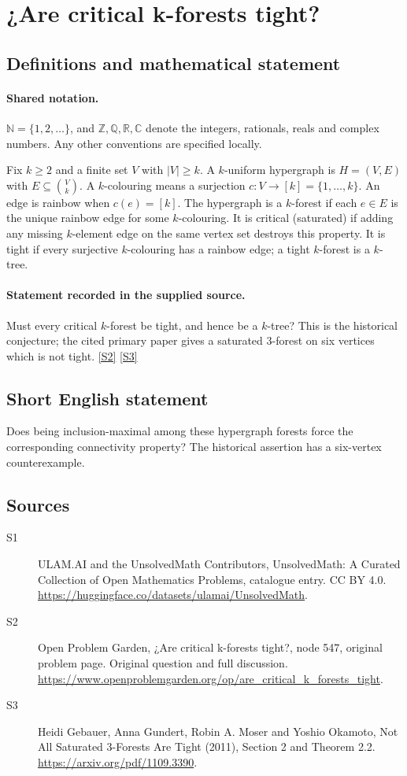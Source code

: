 \documentclass[11pt]{article}
\newcommand{\sref}[2]{\hyperlink{source:#1:#2}{[S#2]}}
\begin{document}
\section{¿Are critical k-forests tight?}\label{statement}

\subsection{Definitions and mathematical statement}

\paragraph{Shared notation.}$\mathbb N=\{1,2,\ldots\}$, and $\mathbb Z,\mathbb Q,\mathbb R,\mathbb C$ denote the integers, rationals, reals and complex numbers. Any other conventions are specified locally.


Fix $k\geq2$ and a finite set $V$ with $|V|\geq k$. A $k$-uniform hypergraph is $H=(V,E)$ with $E\subseteq\binom Vk$. A $k$-colouring means a surjection $c:V\to[k]=\{1,\ldots,k\}$. An edge is rainbow when $c(e)=[k]$. The hypergraph is a $k$-forest if each $e\in E$ is the unique rainbow edge for some $k$-colouring. It is critical (saturated) if adding any missing $k$-element edge on the same vertex set destroys this property. It is tight if every surjective $k$-colouring has a rainbow edge; a tight $k$-forest is a $k$-tree.
\paragraph{Statement recorded in the supplied source.}
Must every critical $k$-forest be tight, and hence be a $k$-tree? This is the historical conjecture; the cited primary paper gives a saturated $3$-forest on six vertices which is not tight. \sref{statement}{2} \sref{statement}{3}
\subsection{Short English statement}
Does being inclusion-maximal among these hypergraph forests force the corresponding connectivity property? The historical assertion has a six-vertex counterexample.
\subsection{Sources}
\begin{description}
\item[\hypertarget{source:statement:1}{S1}] ULAM.AI and the UnsolvedMath Contributors, UnsolvedMath: A Curated Collection of Open Mathematics Problems, catalogue entry. CC BY 4.0. \url{https://huggingface.co/datasets/ulamai/UnsolvedMath}.
\item[\hypertarget{source:statement:2}{S2}] Open Problem Garden, ¿Are critical k-forests tight?, node 547, original problem page. Original question and full discussion. \url{https://www.openproblemgarden.org/op/are_critical_k_forests_tight}.
\item[\hypertarget{source:statement:3}{S3}] Heidi Gebauer, Anna Gundert, Robin A. Moser and Yoshio Okamoto, Not All Saturated 3-Forests Are Tight (2011), Section 2 and Theorem 2.2. \url{https://arxiv.org/pdf/1109.3390}.
\end{description}
\label{end:statement}
\end{document}
